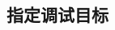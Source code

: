 \documentclass[class=book, crop=false]{standalone}
\begin{document}
\begin{CJK}{UTF8}{gbsn}

\chapter{指定调试目标}









\cleardoublepage

\end{CJK}
\end{document}
